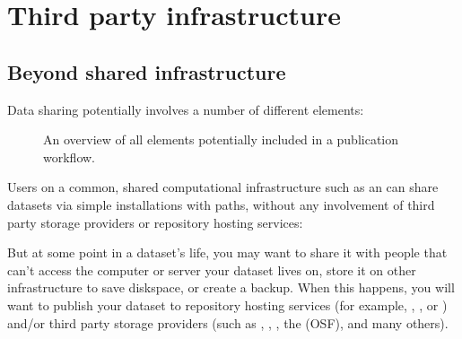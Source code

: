 \chapter{Third party infrastructure}
\label{\detokenize{basics/basics-thirdparty:third-party-infrastructure}}\label{\detokenize{basics/basics-thirdparty:chapter-thirdparty}}\label{\detokenize{basics/basics-thirdparty::doc}}

\sphinxstepscope


\section{Beyond shared infrastructure}
\label{\detokenize{basics/101-138-sharethirdparty:beyond-shared-infrastructure}}\label{\detokenize{basics/101-138-sharethirdparty:sharethirdparty}}\label{\detokenize{basics/101-138-sharethirdparty::doc}}
\sphinxAtStartPar
Data sharing potentially involves a number of different elements:

\begin{figure}[tbp]
\centering
\capstart

\noindent{}
\caption{An overview of all elements potentially included in a publication workflow.}\label{\detokenize{basics/101-138-sharethirdparty:id7}}\end{figure}

\sphinxAtStartPar
Users on a common, shared computational infrastructure such as an {\hyperref[\detokenize{glossary:term-SSH-server}]{}}
can share datasets via simple installations with paths, without any involvement of third party storage providers or repository hosting services:

\begin{figure}[tbp]
\centering

\noindent{}
\end{figure}

\sphinxAtStartPar
But at some point in a dataset’s life, you may want to share it with people that
can’t access the computer or server your dataset lives on, store it on other infrastructure
to save diskspace, or create a backup.
When this happens, you will want to publish your dataset to repository hosting
services (for example, {\hyperref[\detokenize{glossary:term-GitHub}]{}}, {\hyperref[\detokenize{glossary:term-GitLab}]{}}, or {\hyperref[\detokenize{glossary:term-GIN}]{}})
and/or third party storage providers (such as , ,
,
the  (OSF), and many others).

